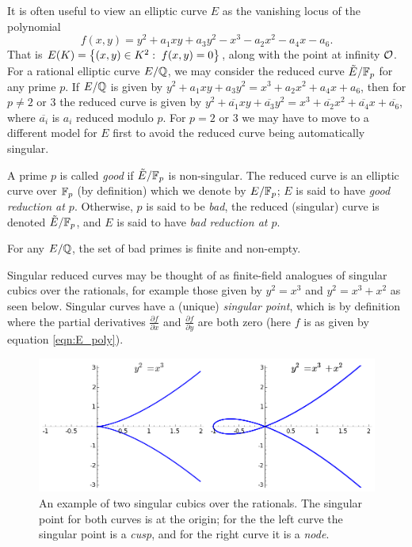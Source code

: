 It is often useful to view an elliptic curve $E$ as the vanishing locus of the polynomial
\begin{equation}\label{eqn:E_poly}
f(x,y) = y^2 + a_1 xy + a_3 y^2 - x^3 - a_2 x^2 - a_4 x - a_6.
\end{equation}
 That is $E(K) = \left\{(x,y) \in K^2: \; f(x,y) = 0\right\}$, along with the point at infinity $\mathcal{O}$. \\

For a rational elliptic curve $E/\mathbb{Q}$, we may consider the reduced curve $\tilde{E}/\mathbb{F}_p$ for any prime $p$. If $E/\mathbb{Q}$ is given by $y^2 + a_1 xy + a_3 y^2 = x^3 + a_2 x^2 + a_4 x + a_6$, then for $p\ne 2$ or $3$ the reduced curve is given by $y^2 + \overline{a_1} xy + \overline{a_3} y^2 = x^3 + \overline{a_2} x^2 + \overline{a_4} x + \overline{a_6}$, where $\overline{a_i}$ is $a_i$ reduced modulo $p$. For $p = 2$ or $3$ we may have to move to a different model for $E$ first to avoid the reduced curve being automatically singular.

\begin{definition}
A prime $p$ is called {\it good} if $\tilde{E}/\mathbb{F}_p$ is non-singular. The reduced curve is an elliptic curve over $\mathbb{F}_p$ (by definition) which we denote by $E/\mathbb{F}_p$; $E$ is said to have {\it good reduction at $p$}. Otherwise, $p$ is said to be {\it bad}, the reduced (singular) curve is denoted $\tilde{E}/\mathbb{F}_p$, and $E$ is said to have {\it bad reduction at $p$}.
\end{definition}

\begin{theorem}
For any $E/\mathbb{Q}$, the set of bad primes is finite and non-empty.
\end{theorem}

Singular reduced curves may be thought of as finite-field analogues of singular cubics over the rationals, for example those given by $y^2 = x^3$ and $y^2 = x^3+x^2$ as seen below. Singular curves have a (unique) {\it singular point}, which is by definition where the partial derivatives $\frac{\partial f}{\partial x}$ and $\frac{\partial f}{\partial y}$ are both zero (here $f$ is as given by equation \ref{eqn:E_poly}).

\begin{figure}[!h]
    \centering
    \includegraphics[width=1.0\textwidth]{graphics/singular_cubics.png}
    \caption{An example of two singular cubics over the rationals. The singular point for both curves is at the origin; for the the left curve the singular point is a {\it cusp}, and for the right curve it is a {\it node}.}
    \label{fig:singular_cubics}
\end{figure}

